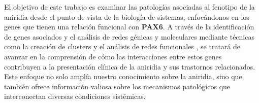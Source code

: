 El objetivo de este trabajo es examinar las patologías asociadas al fenotipo de la aniridia desde el punto de vista de la biología de sistemas, enfocándonos en los genes que tienen una relación funcional con \textbf{PAX6}. A través de la identificación de genes asociados y el análisis de redes génicas y moleculares mediante técnicas como la creación de clusters\cite{ben1999clustering} y el análisis de redes funcionales \cite{FloresCamacho2009}, se tratará de avanzar en la comprensión de cómo las interacciones entre estos genes contribuyen a la presentación clínica de la aniridia
y sus trastornos relacionados. Este enfoque no solo amplía nuestro conocimiento sobre la aniridia, sino que también ofrece información valiosa sobre los mecanismos
patológicos que interconectan diversas condiciones sistémicas.

